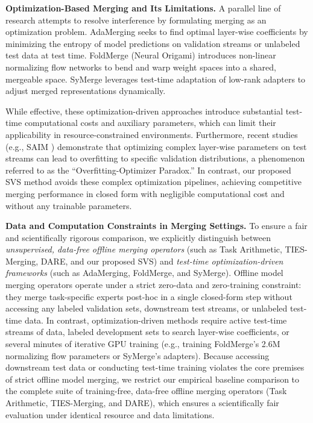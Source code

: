 \textbf{Optimization-Based Merging and Its Limitations.}
A parallel line of research attempts to resolve interference by formulating merging as an optimization problem. AdaMerging \cite{yang2023adamerging} seeks to find optimal layer-wise coefficients by minimizing the entropy of model predictions on validation streams or unlabeled test data at test time. FoldMerge (Neural Origami) \cite{foldmerge2025} introduces non-linear normalizing flow networks to bend and warp weight spaces into a shared, mergeable space. SyMerge \cite{symerge2025} leverages test-time adaptation of low-rank adapters to adjust merged representations dynamically.

While effective, these optimization-driven approaches introduce substantial test-time computational costs and auxiliary parameters, which can limit their applicability in resource-constrained environments. Furthermore, recent studies (e.g., SAIM \cite{saim2025}) demonstrate that optimizing complex layer-wise parameters on test streams can lead to overfitting to specific validation distributions, a phenomenon referred to as the ``Overfitting-Optimizer Paradox.'' In contrast, our proposed SVS method avoids these complex optimization pipelines, achieving competitive merging performance in closed form with negligible computational cost and without any trainable parameters.

\textbf{Data and Computation Constraints in Merging Settings.} To ensure a fair and scientifically rigorous comparison, we explicitly distinguish between \emph{unsupervised, data-free offline merging operators} (such as Task Arithmetic, TIES-Merging, DARE, and our proposed SVS) and \emph{test-time optimization-driven frameworks} (such as AdaMerging, FoldMerge, and SyMerge). Offline model merging operators operate under a strict zero-data and zero-training constraint: they merge task-specific experts post-hoc in a single closed-form step without accessing any labeled validation sets, downstream test streams, or unlabeled test-time data. In contrast, optimization-driven methods require active test-time streams of data, labeled development sets to search layer-wise coefficients, or several minutes of iterative GPU training (e.g., training FoldMerge's 2.6M normalizing flow parameters or SyMerge's adapters). Because accessing downstream test data or conducting test-time training violates the core premises of strict offline model merging, we restrict our empirical baseline comparison to the complete suite of training-free, data-free offline merging operators (Task Arithmetic, TIES-Merging, and DARE), which ensures a scientifically fair evaluation under identical resource and data limitations.

